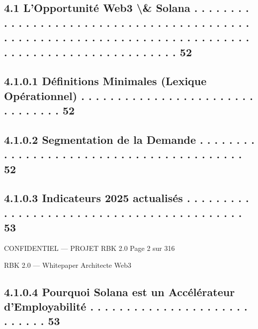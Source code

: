 \documentclass[12pt,landscape,a4paper]{article}
\newenvironment{confidential}
{\begin{tcolorbox}[
    colback=rbkred!5!white,
    colframe=rbkred!75!black,
    title=CONFIDENTIEL,
    fonttitle=\bfseries\color{white},
    coltitle=rbkred!75!black,
    breakable,
    enhanced,
    frame hidden,
    borderline west={2pt}{0pt}{rbkred!75!black}
]}
{\end{tcolorbox}}
\begin{document}
\subsection{4.1     L’Opportunité Web3 \textbackslash{}& Solana . . . . . . . . . . . . . . . . . . . . . . . . . . . . . . . . . . . . . . . . . . . . . . . . . . . . . . . . . . . . . . . . . . . . . . . . . . . . . . . . . . . . . . . . . . . . . . . . . . . . 52}
\subsection{4.1.0.1           Définitions Minimales (Lexique Opérationnel) . . . . . . . . . . . . . . . . . . . . . . . . . . . . . . . .                                                                                                                 52}
\subsection{4.1.0.2           Segmentation de la Demande . . . . . . . . . . . . . . . . . . . . . . . . . . . . . . . . . . . . . . . . .                                                                                                                 52}
\subsection{4.1.0.3           Indicateurs 2025 actualisés . . . . . . . . . . . . . . . . . . . . . . . . . . . . . . . . . . . . . . . . . .                                                                                                              53}
\vspace{0.5em}
\vspace{0.5em}
\vspace{0.5em}
\begin{confidential}CONFIDENTIEL — PROJET RBK 2.0                                                                               Page 2 sur 316\end{confidential}
RBK 2.0 — Whitepaper Architecte Web3\\
\vspace{0.5em}
\vspace{0.5em}
\subsection{4.1.0.4           Pourquoi Solana est un Accélérateur d’Employabilité                                                         . . . . . . . . . . . . . . . . . . . . . . . . . . . .                                                    53}
\end{document}
